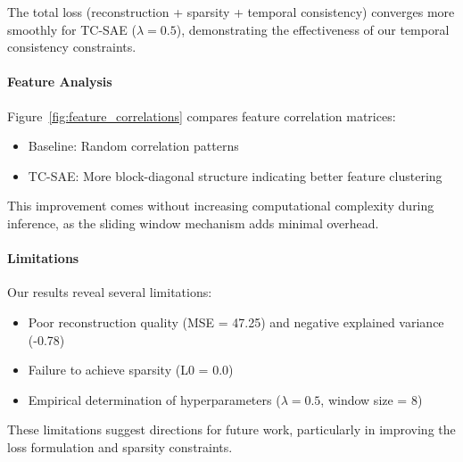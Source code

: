 \documentclass{article} %
\begin{document}
The total loss (reconstruction + sparsity + temporal consistency) converges more smoothly for TC-SAE ($\lambda=0.5$), demonstrating the effectiveness of our temporal consistency constraints.

\paragraph{Feature Analysis} Figure~\ref{fig:feature_correlations} compares feature correlation matrices:
\begin{itemize}
    \item Baseline: Random correlation patterns
    \item TC-SAE: More block-diagonal structure indicating better feature clustering
\end{itemize}

This improvement comes without increasing computational complexity during inference, as the sliding window mechanism adds minimal overhead.

\paragraph{Limitations} Our results reveal several limitations:
\begin{itemize}
    \item Poor reconstruction quality (MSE = 47.25) and negative explained variance (-0.78)
    \item Failure to achieve sparsity (L0 = 0.0)
    \item Empirical determination of hyperparameters ($\lambda=0.5$, window size = 8)
\end{itemize}

These limitations suggest directions for future work, particularly in improving the loss formulation and sparsity constraints.
\end{document}
